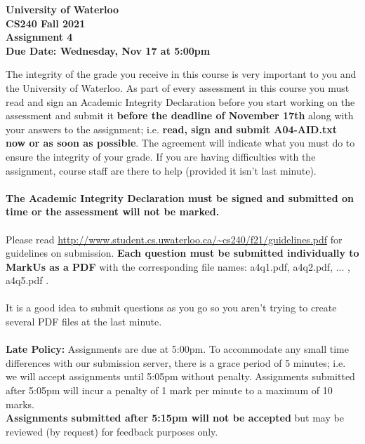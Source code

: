 \documentclass[12pt]{article}
\begin{document}
	
	\begin{center}
		{\Large\bf University of Waterloo}\\
		\vspace{3mm}
		{\Large\bf CS240 Fall 2021}\\
		\vspace{2mm}
		{\Large\bf Assignment 4}\\
		\vspace{3mm}
		\textbf{Due Date: Wednesday, Nov 17 at 5:00pm}
	\end{center}
	
	\def\question#1{\item[\bf #1.]}
	\def\part#1{\item[\bf #1)]}
	\newcommand{\pc}[1]{\mbox{\textbf{#1}}} %
	
	The integrity of the grade you receive in this course is very important to you and 
	the University of Waterloo.  As part of every assessment in this course you must read 
	and sign an Academic Integrity Declaration before you start working on the assessment and
	submit it \textbf{before the deadline of November 17th} along with your answers to the 
	assignment; i.e. \textbf{read, sign and submit A04-AID.txt now or as soon as possible}.
	The agreement will indicate what you must do to ensure the integrity of your grade.
	If you are having difficulties with the assignment, course staff are there to help
	(provided it isn't last minute). \\
	~\\
	\textbf{The Academic Integrity Declaration must be signed and submitted on time or the
		assessment will not be marked.} \\
	~\\
	Please read
	\url{http://www.student.cs.uwaterloo.ca/~cs240/f21/guidelines.pdf} for guidelines on submission.  
	\textbf{Each question must be submitted individually to MarkUs as a PDF} with the corresponding file names: 
	a4q1.pdf, a4q2.pdf, ... , a4q5.pdf . \\
	~\\
	It is a good idea to submit questions as you go so you aren't trying to create several PDF files at the last minute. \\
	~\\
	\textbf{Late Policy:} Assignments are due at 5:00pm.
	To accommodate any small time differences with our submission server, there is a grace period of 5 minutes; i.e. we will accept assignments until 5:05pm without penalty.  Assignments submitted after 5:05pm will incur a penalty of 1 mark per minute to a maximum of 10 marks.   \\
	\textbf{Assignments submitted after 5:15pm will not be accepted}  
	but may be reviewed (by request) for feedback purposes only. \\  
	~\\
	
\end{document}
